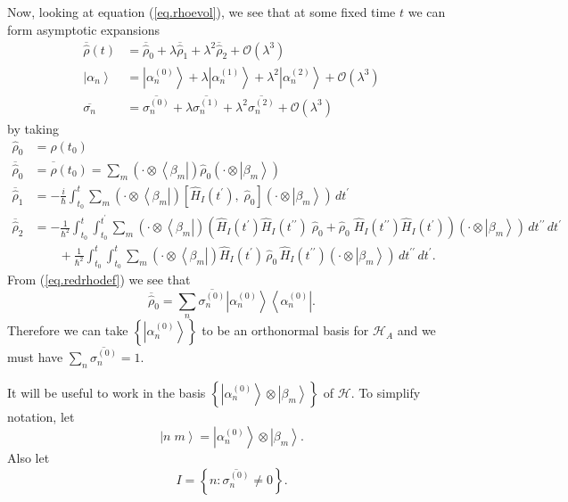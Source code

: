 \documentclass[11pt]{article}
\newcommand{\Od}[1]{\mathcal{O}{\left(#1\right)}}
\newcommand{\bra}[1]{\left\langle#1\right|}
\newcommand{\ket}[1]{\left|#1\right\rangle}
\newcommand{\hilb}{\mathcal{H}}
\newcommand{\op}[1]{\hat{#1}}
\newcommand{\bket}[2]{\ket{#1\;#2}}
\theoremstyle{theorem}
\theoremstyle{remark}
\theoremstyle{step}
\theoremstyle{gap}
\begin{document}
Now, looking at equation (\ref{eq.rhoevol}), we see that at some fixed time \(t\) we can form asymptotic expansions
\begin{align*}
\overline{\op{\rho}}(t) &= \overline{\op{\rho}}_0 + \lambda \overline{\op{\rho}}_1 + \lambda^2 \overline{\op{\rho}}_2 + \Od{\lambda^3} \\
\ket{\alpha_n} &= \ket{\alpha_n^{(0)}} + \lambda \ket{\alpha_n^{(1)}} + \lambda^2 \ket{\alpha_n^{(2)}} + \Od{\lambda^3} \\
\overline{\sigma_n} &= \overline{\sigma_n^{(0)}} + \lambda \overline{\sigma_n^{(1)}} + \lambda^2 \overline{\sigma_n^{(2)}} + \Od{\lambda^3}
\end{align*}
by taking
\begin{align}
\nonumber\op{\rho}_0 &= \op{\rho}\left(t_0\right) \\
\nonumber\overline{\op{\rho}}_0 &= \overline{\op{\rho}}\left(t_0\right) =  \sum_m \left(\cdot\otimes\bra{\beta_m}\right) \op{\rho}_0 \left(\cdot\otimes\ket{\beta_m}\right) \\
\label{eq.rho1red}\overline{\op{\rho}}_1 &= -\frac{i}{\hbar} \int_{t_0}^t \sum_m \left(\cdot\otimes\bra{\beta_m}\right) \left[\op{H}_I(t^\prime),\; \op{\rho}_0 \right]\left(\cdot\otimes\ket{\beta_m}\right) \,dt^\prime\\
\label{eq.rho2red}\overline{\op{\rho}}_2 &= - \frac{1}{\hbar^2} \int_{t_0}^t \int_{t_0}^{t^\prime} \sum_m \left(\cdot\otimes\bra{\beta_m}\right) \left( \op{H}_I (t^\prime) \op{H}_I(t^{\prime\prime}) \;\op{\rho}_0 + \op{\rho}_0\; \op{H}_I (t^{\prime\prime}) \op{H}_I(t^{\prime}) \right)\left(\cdot\otimes\ket{\beta_m}\right)\,dt^{\prime\prime}\,dt^\prime \\
\nonumber&\hspace{2em}+ \frac{1}{\hbar^2} \int_{t_0}^t \int_{t_0}^{t} \sum_m \left(\cdot\otimes\bra{\beta_m}\right) \op{H}_I (t^\prime) \,\op{\rho}_0\, \op{H}_I (t^{\prime\prime})\left(\cdot\otimes\ket{\beta_m}\right)\,dt^{\prime\prime}\,dt^\prime.
\end{align}
From (\ref{eq.redrhodef}) we see that
\begin{equation}\label{eq.rho0red}
\overline{\op{\rho}}_0 = \sum_n \overline{\sigma_{n}^{(0)}} \ket{\alpha_n^{(0)}}\bra{\alpha_n^{(0)}}.
\end{equation}
Therefore we can take \(\left\{\ket{\alpha_n^{(0)}}\right\}\) to be an orthonormal basis for \(\hilb_A\) and we must have \(\sum_n \overline{\sigma_n^{(0)}} = 1\).

It will be useful to work in the basis \(\left\{\ket{\alpha_n^{(0)}}\otimes\ket{\beta_m}\right\}\) of \(\hilb\). To simplify notation, let
\[
\bket{n}{m} = \ket{\alpha_n^{(0)}}\otimes\ket{\beta_m}.
\]
Also let
\[
I = \left\{n : \overline{\sigma_n^{(0)}} \neq 0\right\}.
\]
\end{document}

